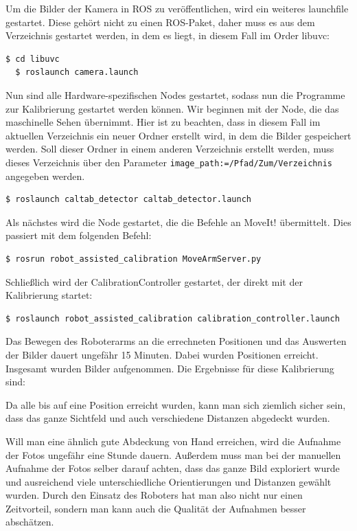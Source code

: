 Um die Bilder der Kamera in ROS zu veröffentlichen, wird ein weiteres launchfile gestartet. Diese gehört nicht zu einen ROS-Paket, daher muss es aus dem Verzeichnis gestartet werden, in dem es liegt, in diesem Fall im Order libuvc: 
\begin{lstlisting}[language=bash]
  $ cd libuvc
  $ roslaunch camera.launch
\end{lstlisting}

Nun sind alle Hardware-spezifischen Nodes gestartet, sodass nun die Programme zur Kalibrierung gestartet werden können. Wir beginnen mit der Node, die das maschinelle Sehen übernimmt. Hier ist zu beachten, dass in diesem Fall im aktuellen Verzeichnis ein neuer Ordner erstellt wird, in dem die Bilder gespeichert werden. Soll dieser Ordner in einem anderen Verzeichnis erstellt werden, muss dieses Verzeichnis über den Parameter \texttt{image\_path:=/Pfad/Zum/Verzeichnis} angegeben werden.
\begin{lstlisting}[language=bash]
  $ roslaunch caltab_detector caltab_detector.launch
\end{lstlisting}

Als nächstes wird die Node gestartet, die die Befehle an MoveIt! übermittelt. Dies passiert mit dem folgenden Befehl:
\begin{lstlisting}[language=bash]
  $ rosrun robot_assisted_calibration MoveArmServer.py
\end{lstlisting}

Schließlich wird der CalibrationController gestartet, der direkt mit der Kalibrierung startet:
\begin{lstlisting}[language=bash]
  $ roslaunch robot_assisted_calibration calibration_controller.launch
\end{lstlisting}

Das Bewegen des Roboterarms an die errechneten Positionen und das Auswerten der Bilder dauert ungefähr 15 Minuten. Dabei wurden  Positionen erreicht. Insgesamt wurden  Bilder aufgenommen. Die Ergebnisse für diese Kalibrierung sind: 

Da alle bis auf eine Position erreicht wurden, kann man sich ziemlich sicher sein, dass das ganze Sichtfeld und auch verschiedene Distanzen abgedeckt wurden. 

Will man eine ähnlich gute Abdeckung von Hand erreichen, wird die Aufnahme der Fotos ungefähr eine Stunde dauern. Außerdem muss man bei der manuellen Aufnahme der Fotos selber darauf achten, dass das ganze Bild exploriert wurde und ausreichend viele unterschiedliche Orientierungen und Distanzen gewählt wurden. Durch den Einsatz des Roboters hat man also nicht nur einen Zeitvorteil, sondern man kann auch die Qualität der Aufnahmen besser abschätzen.